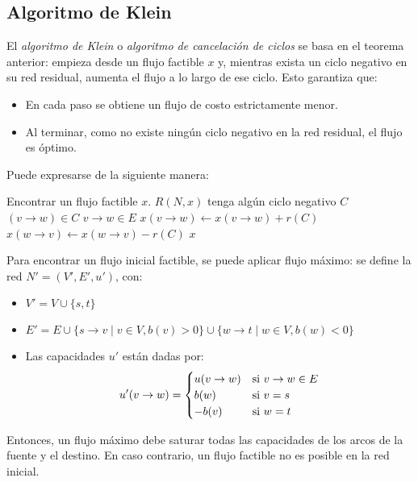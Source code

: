 \subsection{Algoritmo de Klein}

El \textit{algoritmo de Klein} o \textit{algoritmo de cancelación de ciclos} se basa en el teorema anterior: empieza desde un flujo factible $x$ y, mientras exista un ciclo negativo en su red residual, aumenta el flujo a lo largo de ese ciclo. Esto garantiza que:
\begin{itemize}
    \item En cada paso se obtiene un flujo de costo estrictamente menor.
    \item Al terminar, como no existe ningún ciclo negativo en la red residual, el flujo es óptimo.
\end{itemize}

Puede expresarse de la siguiente manera:

\begin{codebox}
    \li Encontrar un flujo factible $x$.
    \li \While $R(N, x)$ tenga algún ciclo negativo $C$ \Do
    \li \For \Each $(v \rightarrow w) \in C$ \Do
    \li \If $v \rightarrow w \in E$ \Then
    \li $x(v \rightarrow w) \gets x(v \rightarrow w) + r(C)$
    \li \Else
    \li $x(w \rightarrow v) \gets x(w \rightarrow v) - r(C)$
    \End
    \End
    \End
    \Return $x$
\end{codebox}

Para encontrar un flujo inicial factible, se puede aplicar flujo máximo: se define la red $N' = (V', E', u')$, con:
\begin{itemize}
    \item $V' = V \cup \{s, t\}$
    \item $E' = E \cup \{s \rightarrow v \mid v \in V, b(v) > 0\} \cup \{w \rightarrow t \mid w \in V, b(w) < 0\}$
    \item Las capacidades $u'$ están dadas por:
          $$
              u'(v \rightarrow w) =
              \begin{cases}
                  u(v \rightarrow w) & \text{si } v \rightarrow w \in E \\
                  b(w)               & \text{si } v = s                 \\
                  -b(v)              & \text{si } w = t
              \end{cases}
          $$
\end{itemize}

Entonces, un flujo máximo debe saturar todas las capacidades de los arcos de la fuente y el destino. En caso contrario, un flujo factible no es posible en la red inicial. %

